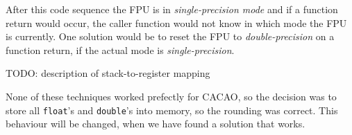 \begin{itemize}
 After this code sequence the FPU is in \textit{single-precision mode}
 and if a function return would occur, the caller function would not
 know in which mode the FPU is currently. One solution would be to
 reset the FPU to \textit{double-precision} on a function return, if
 the actual mode is \textit{single-precision}.
\end{itemize}

TODO: description of stack-to-register mapping

None of these techniques worked prefectly for CACAO, so the decision
was to store all \texttt{float}'s and \texttt{double}'s into memory,
so the rounding was correct. This behaviour will be changed, when we
have found a solution that works.
